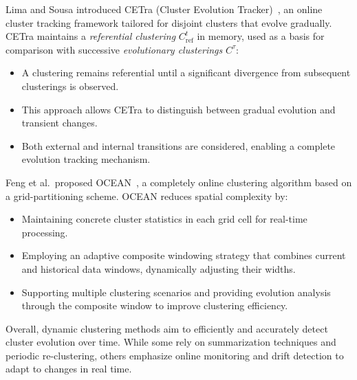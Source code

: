 Lima and Sousa introduced CETra (Cluster Evolution Tracker)~\cite{cetra}, an
online cluster tracking framework tailored for disjoint clusters that evolve
gradually. CETra maintains a \textit{referential clustering}
$C_{\text{ref}}^t$ in memory, used as a basis for comparison with
successive \textit{evolutionary clusterings} $C^{\tau}$:

\begin{itemize}
    \item A clustering remains referential until a significant divergence from subsequent
          clusterings is observed.
    \item This approach allows CETra to distinguish between gradual evolution and
          transient changes.
    \item Both external and internal transitions are considered, enabling a complete
          evolution tracking mechanism.
\end{itemize}

Feng et al.\ proposed OCEAN~\cite{ocean}, a completely online clustering
algorithm based on a grid-partitioning scheme. OCEAN reduces spatial complexity
by:

\begin{itemize}
    \item Maintaining concrete cluster statistics in each grid cell for real-time
          processing.
    \item Employing an adaptive composite windowing strategy that combines current and
          historical data windows, dynamically adjusting their widths.
    \item Supporting multiple clustering scenarios and providing evolution analysis
          through the composite window to improve clustering efficiency.
\end{itemize}

Overall, dynamic clustering methods aim to efficiently and accurately detect
cluster evolution over time. While some rely on summarization techniques and
periodic re-clustering, others emphasize online monitoring and drift detection
to adapt to changes in real time.